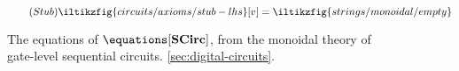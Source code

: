 \begin{figure}
    \begin{minipage}[b]{0.22\textwidth}
        \begin{equation}
            \tag{\(\mathsf{Stub}\)}
            \iltikzfig{circuits/axioms/stub-lhs}[v]
            =
            \iltikzfig{strings/monoidal/empty}
            \label{eq:stub}
        \end{equation}
    \end{minipage}
    \begin{minipage}[b]{0.3\textwidth}
        \forkgateeqn
    \end{minipage}
    \begin{minipage}[b]{0.25\textwidth}
        \stubgateeqn
    \end{minipage}
    \begin{minipage}[b]{0.25\textwidth}
        \stubdelayeqn
    \end{minipage}
    \begin{minipage}[b]{0.22\textwidth}
        \forkjoininverseeqn
    \end{minipage}
    \begin{minipage}[b]{0.4\textwidth}
        \streamingeqn
    \end{minipage}
    \begin{minipage}[b]{0.25\textwidth}
        \disconnecteqn
    \end{minipage}
    \begin{minipage}[b]{0.25\textwidth}
        \forkdelayeqn
    \end{minipage}
    \begin{minipage}[b]{0.25\textwidth}
        \joindelayeqn
    \end{minipage}
    \begin{minipage}[b]{0.3\textwidth}
        \instantfeedbackeqn
    \end{minipage}
    \begin{minipage}[b]{0.35\textwidth}
        \delaydiscardeqn
    \end{minipage}
    \caption{
        The equations of \(\equations[\mathbf{SCirc}]\), from the monoidal
        theory of gate-level sequential circuits.
        \cref{sec:digital-circuits}.
    }
    \label{fig:circuit-equations}
\end{figure}